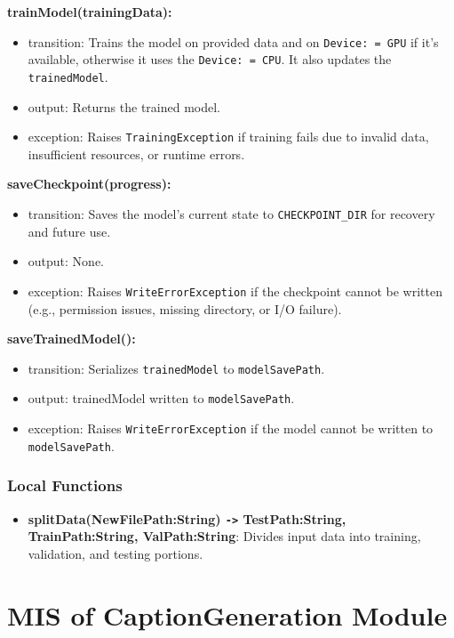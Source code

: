 \documentclass[12pt, titlepage]{article}
\begin{document}
\noindent \textbf{trainModel(trainingData):}
\begin{itemize}
  \item transition: Trains the model on provided data and on \texttt{Device: = GPU} if it's available, otherwise it uses the \texttt{Device: = CPU}. It also updates the \texttt{trainedModel}.
  \item output: Returns the trained model.
  \item exception: Raises \texttt{TrainingException} if training fails due to invalid data, insufficient resources, or runtime errors.
\end{itemize}

\noindent \textbf{saveCheckpoint(progress):}
\begin{itemize}
  \item transition: Saves the model’s current state to \texttt{CHECKPOINT\_DIR} for recovery and future use.
  \item output: None.
  \item exception: Raises \texttt{WriteErrorException} if the checkpoint cannot be written (e.g., permission issues, missing directory, or I/O failure).
\end{itemize}

\noindent \textbf{saveTrainedModel():}
\begin{itemize}
  \item transition: Serializes \texttt{trainedModel} to \texttt{modelSavePath}.
  \item output: trainedModel written to \texttt{modelSavePath}.
  \item exception: Raises \texttt{WriteErrorException} if the model cannot be written to \texttt{modelSavePath}.
\end{itemize}


\subsubsection{Local Functions}
\begin{itemize}
  \item \textbf{splitData(NewFilePath:String) \texttt{->} TestPath:String, TrainPath:String, ValPath:String}: Divides input data into training, validation, and testing portions.
\end{itemize}


\section{MIS of CaptionGeneration Module} \label{capgen}
\end{document}
